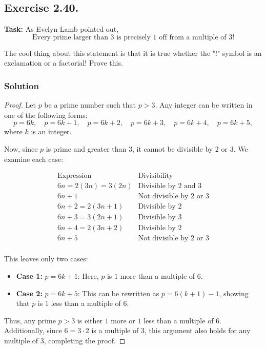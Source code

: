 \documentclass{article}
\begin{document}
\newpage

\subsection{Exercise 2.40.}
\textbf{Task:} As Evelyn Lamb pointed out,
\[\text{Every prime larger than 3 is precisely 1 off from a multiple of 3!}\]

\noindent The cool thing about this statement is that it is true whether the "!" symbol is an exclamation or a factorial! Prove this.

\subsubsection*{Solution}

\begin{proof}
Let \( p \) be a prime number such that \( p > 3 \). Any integer can be written in one of the following forms:
\[
p = 6k, \quad p = 6k + 1, \quad p = 6k + 2, \quad p = 6k + 3, \quad p = 6k + 4, \quad p = 6k + 5,
\]
where \( k \) is an integer.

Now, since \( p \) is prime and greater than \( 3 \), it cannot be divisible by \( 2 \) or \( 3 \). We examine each case:

  \[
\begin{array}{c|c}
\text{Expression} & \text{Divisibility} \\
\hline
6n=2(3n)=3(2n)    & \text{Divisible by 2 and 3} \\
6n + 1       & \text{Not divisible by 2 or 3} \\
6n + 2  = 2(3n+1)     & \text{Divisible by 2} \\
6n + 3  = 3(2n+1)   & \text{Divisible by 3} \\
6n + 4  = 2(3n+2)   & \text{Divisible by 2} \\
6n + 5       & \text{Not divisible by 2 or 3} \\
\end{array}
\]

This leaves only two cases:

\begin{itemize}
    \item \textbf{Case 1:} \( p = 6k + 1 \): Here, \( p \) is \( 1 \) more than a multiple of \( 6 \).
    \item \textbf{Case 2:} \( p = 6k + 5 \): This can be rewritten as \( p = 6(k + 1) - 1 \), showing that \( p \) is \( 1 \) less than a multiple of \( 6 \).
\end{itemize}

Thus, any prime \( p > 3 \) is either \( 1 \) more or \( 1 \) less than a multiple of \( 6 \). Additionally, since $6 = 3 \cdot 2$ is a multiple of $3$, this argument also holds for any multiple of $3$, completing the proof.
\end{proof}
\end{document}
